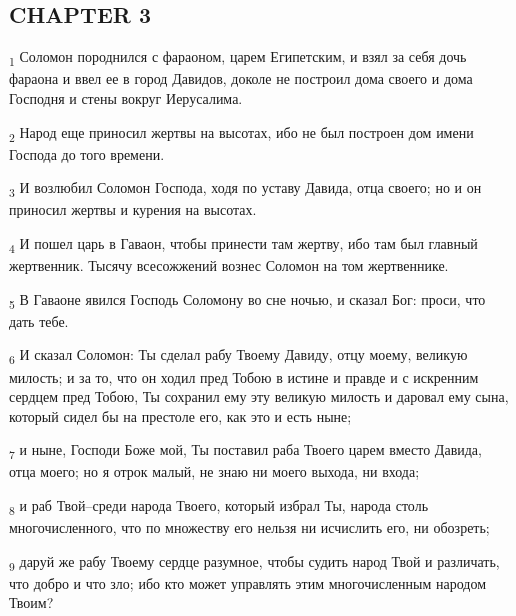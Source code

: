 \subsection{CHAPTER 3}
\begin{tcolorbox}
\textsubscript{1} Соломон породнился с фараоном, царем Египетским, и взял за себя дочь фараона и ввел ее в город Давидов, доколе не построил дома своего и дома Господня и стены вокруг Иерусалима.
\end{tcolorbox}
\begin{tcolorbox}
\textsubscript{2} Народ еще приносил жертвы на высотах, ибо не был построен дом имени Господа до того времени.
\end{tcolorbox}
\begin{tcolorbox}
\textsubscript{3} И возлюбил Соломон Господа, ходя по уставу Давида, отца своего; но и он приносил жертвы и курения на высотах.
\end{tcolorbox}
\begin{tcolorbox}
\textsubscript{4} И пошел царь в Гаваон, чтобы принести там жертву, ибо там был главный жертвенник. Тысячу всесожжений вознес Соломон на том жертвеннике.
\end{tcolorbox}
\begin{tcolorbox}
\textsubscript{5} В Гаваоне явился Господь Соломону во сне ночью, и сказал Бог: проси, что дать тебе.
\end{tcolorbox}
\begin{tcolorbox}
\textsubscript{6} И сказал Соломон: Ты сделал рабу Твоему Давиду, отцу моему, великую милость; и за то, что он ходил пред Тобою в истине и правде и с искренним сердцем пред Тобою, Ты сохранил ему эту великую милость и даровал ему сына, который сидел бы на престоле его, как это и есть ныне;
\end{tcolorbox}
\begin{tcolorbox}
\textsubscript{7} и ныне, Господи Боже мой, Ты поставил раба Твоего царем вместо Давида, отца моего; но я отрок малый, не знаю ни моего выхода, ни входа;
\end{tcolorbox}
\begin{tcolorbox}
\textsubscript{8} и раб Твой--среди народа Твоего, который избрал Ты, народа столь многочисленного, что по множеству его нельзя ни исчислить его, ни обозреть;
\end{tcolorbox}
\begin{tcolorbox}
\textsubscript{9} даруй же рабу Твоему сердце разумное, чтобы судить народ Твой и различать, что добро и что зло; ибо кто может управлять этим многочисленным народом Твоим?
\end{tcolorbox}

